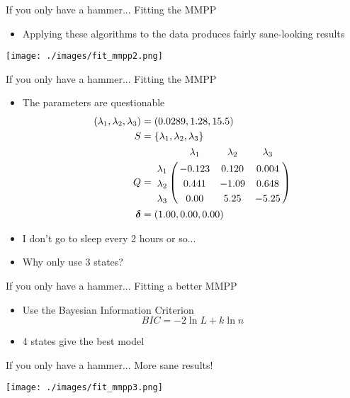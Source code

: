 \documentclass{beamer}
\begin{document}
\begin{frame}{If you only have a hammer...}
Fitting the MMPP
\begin{itemize}
\pause \item Applying these algorithms to the data produces fairly sane-looking results
\end{itemize}
\texttt{[image: ./images/fit\_mmpp2.png]}
\end{frame}

\begin{frame}{If you only have a hammer...}
Fitting the MMPP
\begin{itemize}
\pause \item The parameters are questionable
\begin{align*}
(\lambda_1,\lambda_2,\lambda_3) &= (0.0289,1.28,15.5)\\
S &= \{\lambda_1,\lambda_2,\lambda_3\}\\
Q &= \bordermatrix{      & \lambda_1 & \lambda_2 & \lambda_3\cr
                \lambda_1 & -0.123 & 0.120 & 0.004 \cr
                \lambda_2 & 0.441 & -1.09 & 0.648 \cr
                \lambda_3 & 0.00 & 5.25 & -5.25 \cr
			}\\
\bm{\delta} &= (1.00,0.00,0.00)
\end{align*}
\pause \item I don't go to sleep every 2 hours or so...
\pause \item Why only use 3 states?
\end{itemize}
\end{frame}

\begin{frame}{If you only have a hammer...}
Fitting a better MMPP
\begin{itemize}
\pause \item Use the Bayesian Information Criterion
$$
BIC = -2 \ln L + k \ln n
$$
\pause \item 4 states give the best model
\end{itemize}
\end{frame}

\begin{frame}{If you only have a hammer...}
More sane results!

\texttt{[image: ./images/fit\_mmpp3.png]}
\end{frame}
\end{document}
